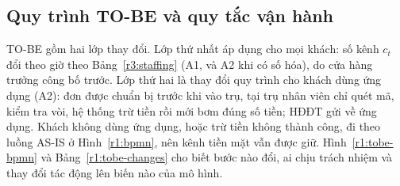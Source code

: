 
\subsection{Quy trình TO-BE và quy tắc vận hành}
\label{r1:tobe}
TO-BE gồm hai lớp thay đổi. Lớp thứ nhất áp dụng cho mọi khách: số kênh $c_t$ đổi theo
giờ theo Bảng~\ref{r3:staffing} (A1, và A2 khi có số hóa), do cửa hàng trưởng công bố
trước. Lớp thứ hai là thay đổi quy trình cho khách dùng ứng dụng (A2): đơn được chuẩn bị
trước khi vào trụ, tại trụ nhân viên chỉ quét mã, kiểm tra vòi, hệ thống trừ tiền rồi
mới bơm đúng số tiền; HĐĐT gửi về ứng dụng. Khách không dùng ứng dụng, hoặc trừ tiền
không thành công, đi theo luồng AS-IS ở Hình~\ref{r1:bpmn}, nên kênh tiền mặt vẫn được giữ.
Hình~\ref{r1:tobe-bpmn} và Bảng~\ref{r1:tobe-changes} cho biết bước nào đổi, ai chịu
trách nhiệm và thay đổi tác động lên biến nào của mô hình.

